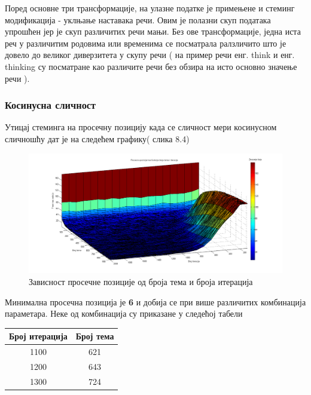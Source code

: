 Поред основне три трансформације, на улазне податке је примењене и стеминг модификација - уклњање наставака речи. Овим је полазни скуп података упрошћен јер је скуп различитих речи мањи. Без ове трансформације, једна иста реч у различитим родовима или временима се посматрала ралзличито што је довело до великог диверзитета у скупу речи ( на пример речи енг. think и енг. thinking су посматране као различите речи без обзира на исто основно значење речи ). 

\subsubsection{Косинусна сличност}



Утицај стеминга на просечну позицију  када се сличност мери косинусном сличношћу дат је на следећем графику( слика 8.4)

		\begin{figure}[H]
    \centering
   \includegraphics[scale=0.3]{./Slike/StemNoSyn.png} 
	\caption{Зависност просечне позиције од броја тема и броја итерација}
	\label{fig:slika1}
\end{figure}

Минимална просечна позиција је \textbf{6} и добија се при више различитих комбинација параметара. Неке од комбинација су приказане у следећој табели

\begin{center}
\begin{tabular}{|c|c|}
\hline
Број итерација & Број тема \\
\hline\hline
1100 & 621 \\
1200 & 643 \\
1300 & 724 \\
\hline
\end{tabular}
\end{center}

